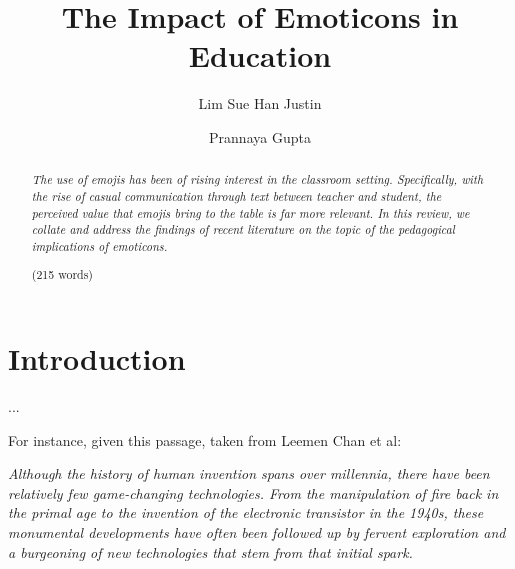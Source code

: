 \documentclass[12pt]{article}
\begin{document}
\pagestyle{fancy}
\fancyhf{}


{\selectfont
\title{
	\huge \textbf{The Impact of Emoticons in Education}
}

\date{}

\author[1]{Lim Sue Han Justin}
\author[1]{Prannaya Gupta}

\maketitle



\begin{abstract}
\emph{The use of emojis has been of rising interest in the classroom setting. Specifically, with the rise of casual communication through text between teacher and student, the perceived value that emojis bring to the table is far more relevant. In this review, we collate and address the findings of recent literature on the topic of the pedagogical implications of emoticons.} \\
\begin{flushright}(215 words)\end{flushright}
\end{abstract}

\thispagestyle{empty}

\thispagestyle{empty}
\newpage

\section{Introduction}
...



For instance, given this passage, taken from Leemen Chan et al:

\begin{displayquote}
\emph{Although the history of human invention spans over millennia, there have been relatively few game-changing technologies. From the manipulation of fire back in the primal age to the invention of the electronic transistor in the 1940s, these monumental developments have often been followed up by fervent exploration and a burgeoning of new technologies that stem from that initial spark.}
\end{displayquote}



}
\end{document}
